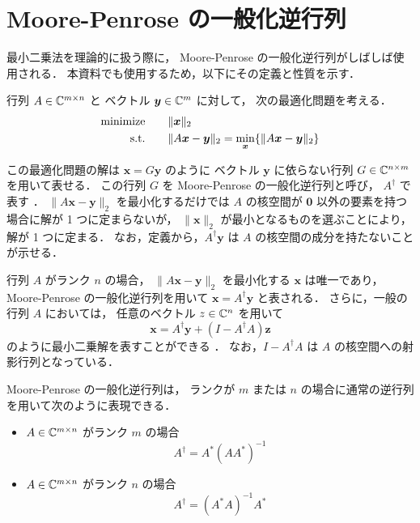 %

\section{Moore-Penrose の一般化逆行列}\label{sec:moore-penrose-generalized-inverse}

最小二乗法を理論的に扱う際に，
Moore-Penrose の一般化逆行列がしばしば使用される．
本資料でも使用するため，以下にその定義と性質を示す．

行列 $A \in \mathbb{C}^{m \times n}$ と
ベクトル $\bm{y} \in \mathbb{C}^m$ に対して，
次の最適化問題を考える．
\begin{align}
    \text{minimize} \hspace{2em} & \|\bm{x}\|_2
    \notag                                                                                          \\
    \text{s.t.} \hspace{2em}     & \|A\bm{x}-\bm{y}\|_2 =  \min_{\bm{x}} \{ \|A\bm{x}-\bm{y}\|_2 \}
    \notag
\end{align}

この最適化問題の解は $\bm{x}=G\bm{y}$ のように
ベクトル $\bm{y}$ に依らない行列
$G \in \mathbb{C}^{n \times m}$ を用いて表せる．
この行列 $G$ を Moore-Penrose の一般化逆行列と呼び，
$A^\dagger$ で表す \cite[定義3]{Rao1971}．
$\|A \bm{x} - \bm{y}\|_2$ を最小化するだけでは
$A$ の核空間が $\bm{0}$ 以外の要素を持つ場合に解が 1 つに定まらないが，
$\|\bm{x}\|_2$ が最小となるものを選ぶことにより，
解が 1 つに定まる．
なお，定義から，$A^\dagger \bm{y}$ は $A$ の核空間の成分を持たないことが示せる．

行列 $A$ がランク $n$ の場合，
$\|A \bm{x} - \bm{y}\|_2$ を最小化する $\bm{x}$ は唯一であり，
Moore-Penrose の一般化逆行列を用いて
$\bm{x} = A^\dagger \bm{y}$ と表される．
さらに，一般の行列 $A$ においては，
任意のベクトル $z \in \mathbb{C}^n$ を用いて
\begin{equation}
    \bm{x} = A^\dagger \bm{y} + (I - A^\dagger A) \bm{z}
    \label{eq:matrix-computation_moore-penrose_general-least-squares-solution}
\end{equation}
のように最小二乗解を表すことができる \cite[定理2.3.1]{Rao1971}．
なお，$I - A^\dagger A$ は $A$ の核空間への射影行列となっている．

Moore-Penrose の一般化逆行列は，
ランクが $m$ または $n$ の場合に通常の逆行列を用いて次のように表現できる．

\begin{itemize}
    \item $A \in \mathbb{C}^{m \times n}$ がランク $m$ の場合
          \begin{equation}
              A^\dagger = A^* (A A^*)^{-1}
          \end{equation}
    \item $A \in \mathbb{C}^{m \times n}$ がランク $n$ の場合
          \begin{equation}
              A^\dagger = (A^* A)^{-1} A^*
          \end{equation}
\end{itemize}

